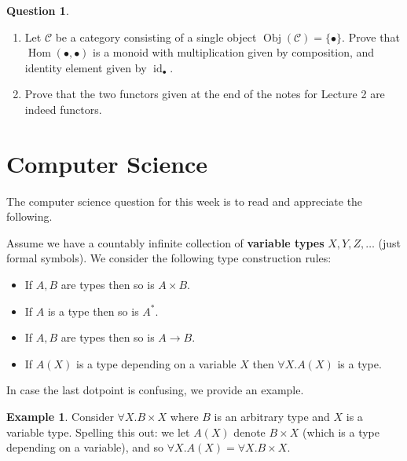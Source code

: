 \documentclass[12pt]{article}
\theoremstyle{plain}
\theoremstyle{definition}
\newtheorem{question}[thm]{Question}
\newtheorem{example}[thm]{Example}
\newcommand{\scr}[1]{\mathscr{#1}}
\newcommand{\lto}{\longrightarrow}
\begin{document}
\begin{question}
\begin{enumerate}
			\item Let $\scr{C}$ be a category consisting of a single object $\operatorname{Obj}(\scr{C}) = \{ \bullet \}$. Prove that $\operatorname{Hom}(\bullet, \bullet)$ is a monoid with multiplication given by composition, and identity element given by $\operatorname{id}_{\bullet}$.
			
			\item Prove that the two functors given at the end of the notes for Lecture 2 are indeed functors.
			\end{enumerate}
		\end{question}
	
	\section{Computer Science}
		The computer science question for this week is to read and appreciate the following.
		
		Assume we have a countably infinite collection of \textbf{variable types} $X, Y, Z, \ldots$ (just formal symbols). We consider the following type construction rules:
		\begin{itemize}
			\item If $A, B$ are types then so is $A \times B$.
			\item If $A$ is a type then so is $A^\ast$.
			\item If $A, B$ are types then so is $A \lto B$.
			\item If $A(X)$ is a type depending on a variable $X$ then $\forall X. A(X)$ is a type.
			\end{itemize}
		In case the last dotpoint is confusing, we provide an example.
		
		\begin{example}
			Consider $\forall X. B \times X$ where $B$ is an arbitrary type and $X$ is a variable type. Spelling this out: we let $A(X)$ denote $B \times X$ (which is a type depending on a variable), and so $\forall X. A(X) = \forall X. B \times X$.
			\end{example}
		
\end{document}
